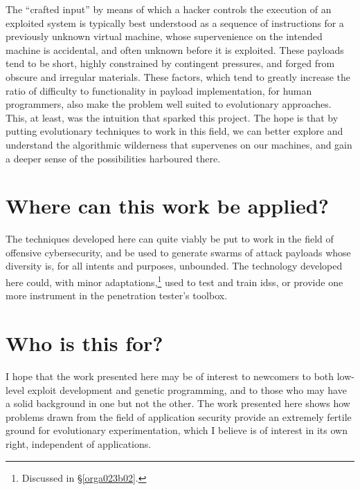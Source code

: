 \documentclass[12pt,glossary]{dalthesis}
\begin{document}
The ``crafted input'' by means of which a hacker controls the execution of
an exploited system is typically best understood as a sequence of instructions
for a previously unknown virtual machine, whose supervenience on the intended
machine is accidental, and often unknown before it is exploited.
These payloads tend to be short, highly constrained by contingent
pressures, and forged from obscure and irregular materials. These factors,
which tend to greatly increase the ratio of difficulty to functionality in
payload implementation, for human programmers, also make the problem
well suited to evolutionary approaches. This, at least, was the intuition
that sparked this project. The hope is that by putting evolutionary techniques
to work in this field, we can better explore and understand the algorithmic
wilderness that supervenes on our machines, and gain a deeper sense of the
possibilities harboured there.

\section{Where can this work be applied?}
\label{sec:orgc7d2e56}
The techniques developed here can quite viably be put to work in the field of
offensive cybersecurity, and be used to generate swarms of attack payloads whose
diversity is, for all intents and purposes, unbounded. The technology developed
here could, with minor adaptations,\footnote{Discussed in \S \ref{orga023b02}.} used
to test and train \glspl{ids}, or provide one more instrument in the penetration
tester's toolbox.

\section{Who is this for?}
\label{sec:org1ab82ad}

I hope that the work presented here may be of interest to newcomers to
both low-level exploit development and genetic programming, and to those
who may have a solid background in one but not the other. The work presented
here shows how problems drawn from the field of application security provide
an extremely fertile ground for evolutionary experimentation, which I believe
is of interest in its own right, independent of applications. 
\end{document}
